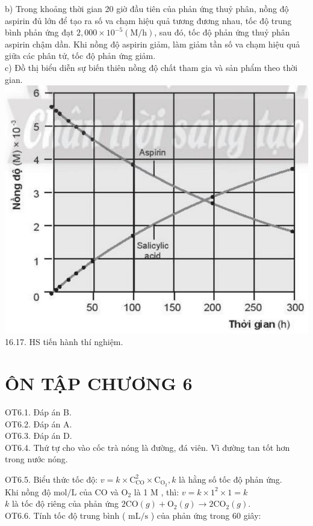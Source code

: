 \documentclass[10pt]{article}
\begin{document}
b) Trong khoảng thời gian 20 giờ đầu tiên của phản ứng thuỷ phân, nồng độ aspirin đủ lớn để tạo ra số va chạm hiệu quả tương đương nhau, tốc độ trung bình phản ứng đạt $2,000 \times 10^{-5}(\mathrm{M} / \mathrm{h})$, sau đó, tốc độ phản ứng thuỷ phân aspirin chậm dần. Khi nồng độ aspirin giảm, làm giảm tần số va chạm hiệu quả giữa các phân tử, tốc độ phản ứng giảm.\\
c) Đồ thị biểu diễn sự biến thiên nồng độ chất tham gia và sản phẩm theo thời gian.\\
\includegraphics[max width=\textwidth, center]{2025_10_23_57761e23b8c46a11c3efg-53}\\
16.17. HS tiến hành thí nghiệm.

\section*{ÔN TẬP CHƯƠNG 6}
OT6.1. Đáp án B.\\
OT6.2. Đáp án A.\\
OT6.3. Đáp án D.\\
OT6.4. Thứ tự cho vào cốc trà nóng là đường, đá viên. Vì đường tan tốt hơn trong nước nóng.

OT6.5. Biểu thức tốc độ: $v=k \times \mathrm{C}_{\mathrm{CO}}^{2} \times \mathrm{C}_{\mathrm{O}_{2}}, k$ là hằng số tốc độ phản ứng.\\
Khi nồng độ $\mathrm{mol} / \mathrm{L}$ của CO và $\mathrm{O}_{2}$ là 1 M , thì: $v=k \times 1^{2} \times 1=k$\\
$k$ là tốc độ riêng của phản ứng $2 \mathrm{CO}(g)+\mathrm{O}_{2}(g) \rightarrow 2 \mathrm{CO}_{2}(g)$.\\
OT6.6. Tính tốc độ trung bình ( $\mathrm{mL} / \mathrm{s}$ ) của phản ứng trong 60 giây:
\end{document}
